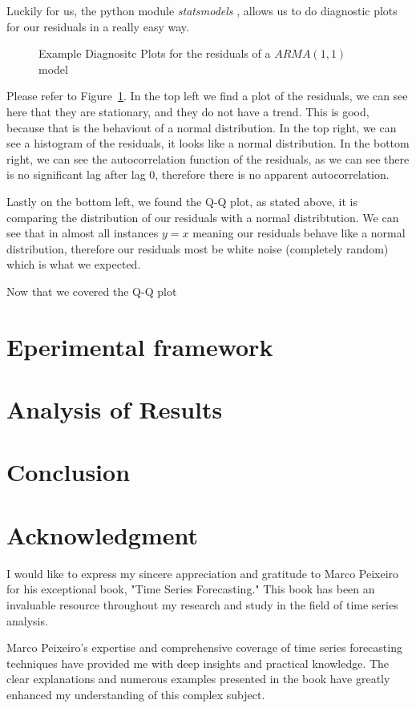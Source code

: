 \documentclass[journal]{IEEEtran}
\begin{document}
Luckily for us, the python module \emph{statsmodels} \cite{statsmodels},
allows us to do diagnostic plots for our residuals in a really easy way. 

\begin{figure}[htbp]
  \centering
  
    \caption{Example Diagnositc Plots for the residuals of a $ARMA(1,1)$ model}
  \label{fig:diag-example}
\end{figure}

Please refer to Figure~\ref{fig:diag-example}. In the top left we find a plot
of the residuals, we can see here that they are stationary, and they do not
have a trend. This is good, because that is the behaviout of a normal
distribution. In the top right, we can see a histogram of the residuals, it
looks like a normal distribution. In the bottom right, we can see the
autocorrelation function of the residuals, as we can see there is no
significant lag after lag 0, therefore there is no apparent autocorrelation.

Lastly on the bottom left, we found the Q-Q plot, as stated above, it is
comparing the distribution of our residuals with a normal distribtution. We
can see that in almost all instances $y=x$ meaning our residuals behave like a
normal distribution, therefore our residuals most be white noise (completely
random) which is what we expected.

Now that we covered the Q-Q plot 



\section{Eperimental framework}

\section{Analysis of Results}\label{sec:analysis}

\section{Conclusion}\label{sec:conclusion}

\section*{Acknowledgment}
I would like to express my sincere appreciation and gratitude to Marco
Peixeiro for his exceptional book, "Time Series Forecasting." This book has
been an invaluable resource throughout my research and study in the field of
time series analysis.

Marco Peixeiro's expertise and comprehensive coverage of time series
forecasting techniques have provided me with deep insights and practical
knowledge. The clear explanations and numerous examples presented in the book
have greatly enhanced my understanding of this complex subject.




\end{document}
